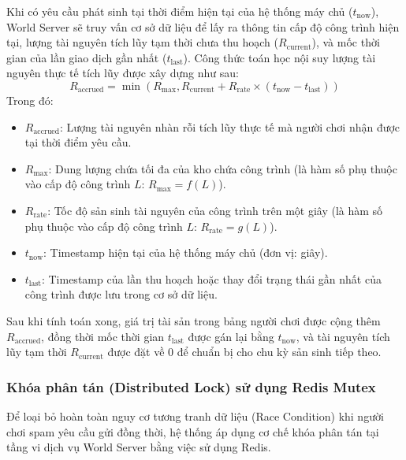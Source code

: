 \documentclass[../Project.tex]{subfiles}
\begin{document}
Khi có yêu cầu phát sinh tại thời điểm hiện tại của hệ thống máy chủ (\(t_{\text{now}}\)), World Server sẽ truy vấn cơ sở dữ liệu để lấy ra thông tin cấp độ công trình hiện tại, lượng tài nguyên tích lũy tạm thời chưa thu hoạch (\(R_{\text{current}}\)), và mốc thời gian của lần giao dịch gần nhất (\(t_{\text{last}}\)). Công thức toán học nội suy lượng tài nguyên thực tế tích lũy được xây dựng như sau:
\[ R_{\text{accrued}} = \min\left(R_{\text{max}}, R_{\text{current}} + R_{\text{rate}} \times (t_{\text{now}} - t_{\text{last}})\right) \]
Trong đó:
\begin{itemize}
    \item \(R_{\text{accrued}}\): Lượng tài nguyên nhàn rỗi tích lũy thực tế mà người chơi nhận được tại thời điểm yêu cầu.
    \item \(R_{\text{max}}\): Dung lượng chứa tối đa của kho chứa công trình (là hàm số phụ thuộc vào cấp độ công trình \(L\): \(R_{\text{max}} = f(L)\)).
    \item \(R_{\text{rate}}\): Tốc độ sản sinh tài nguyên của công trình trên một giây (là hàm số phụ thuộc vào cấp độ công trình \(L\): \(R_{\text{rate}} = g(L)\)).
    \item \(t_{\text{now}}\): Timestamp hiện tại của hệ thống máy chủ (đơn vị: giây).
    \item \(t_{\text{last}}\): Timestamp của lần thu hoạch hoặc thay đổi trạng thái gần nhất của công trình được lưu trong cơ sở dữ liệu.
\end{itemize}

Sau khi tính toán xong, giá trị tài sản trong bảng người chơi được cộng thêm \(R_{\text{accrued}}\), đồng thời mốc thời gian \(t_{\text{last}}\) được gán lại bằng \(t_{\text{now}}\), và tài nguyên tích lũy tạm thời \(R_{\text{current}}\) được đặt về 0 để chuẩn bị cho chu kỳ sản sinh tiếp theo.

\subsubsection{Khóa phân tán (Distributed Lock) sử dụng Redis Mutex}
Để loại bỏ hoàn toàn nguy cơ tương tranh dữ liệu (Race Condition) khi người chơi spam yêu cầu gửi đồng thời, hệ thống áp dụng cơ chế khóa phân tán tại tầng vi dịch vụ World Server bằng việc sử dụng Redis. 
\end{document}
